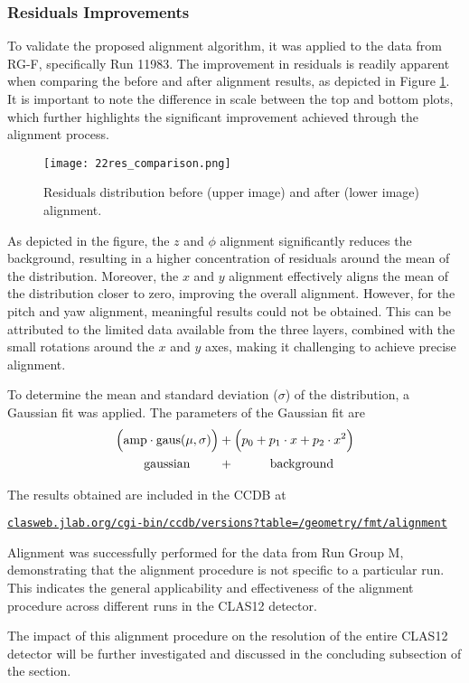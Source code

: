 \subsubsection{Residuals Improvements}
\label{12.22::residuals_improvements}
    To validate the proposed alignment algorithm, it was applied to the data from RG-F, specifically Run 11983.
    The improvement in residuals is readily apparent when comparing the before and after alignment results, as depicted in Figure \ref{fig::12.22::fmt_residuals_comparison}.
    It is important to note the difference in scale between the top and bottom plots, which further highlights the significant improvement achieved through the alignment process.

    \begin{figure}[t!]
        \texttt{[image: 22res\_comparison.png]}
        \caption[Residuals distribution improvement]
        {Residuals distribution before (upper image) and after (lower image) alignment.}
        \label{fig::12.22::fmt_residuals_comparison}
    \end{figure}

    As depicted in the figure, the $z$ and $\phi$ alignment significantly reduces the background, resulting in a higher concentration of residuals around the mean of the distribution.
    Moreover, the $x$ and $y$ alignment effectively aligns the mean of the distribution closer to zero, improving the overall alignment.
    However, for the pitch and yaw alignment, meaningful results could not be obtained.
    This can be attributed to the limited data available from the three layers, combined with the small rotations around the $x$ and $y$ axes, making it challenging to achieve precise alignment.

    To determine the mean and standard deviation ($\sigma$) of the distribution, a Gaussian fit was applied. The parameters of the Gaussian fit are
     \begin{align*}
        \Big( \text{amp} \cdot \text{gaus}(\mu, \sigma) \Big) &+ \Big( p_0 + p_1\cdot x + p_2\cdot x^2 \Big) \\
        \text{gaussian} \hspace{0.8cm} &+ \hspace{1cm} \text{background}
    \end{align*}

    The results obtained are included in the CCDB at

    \small\href{https://clasweb.jlab.org/cgi-bin/ccdb/versions?table=/geometry/fmt/alignment}{\texttt{clasweb.jlab.org/cgi-bin/ccdb/versions?table=/geometry/fmt/alignment}}

    Alignment was successfully performed for the data from Run Group M, demonstrating that the alignment procedure is not specific to a particular run.
    This indicates the general applicability and effectiveness of the alignment procedure across different runs in the CLAS12 detector.

    The impact of this alignment procedure on the resolution of the entire CLAS12 detector will be further investigated and discussed in the concluding subsection of the section.
